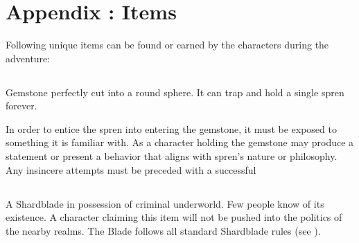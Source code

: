 \chapter{Appendix \thechapter{}: Items}
\label{chap:items}

Following unique items can be found or earned by the characters during the adventure:

\section{\lootPerfectGemstoneName}

Gemstone perfectly cut into a round sphere. It can trap and hold a single spren forever.

In order to entice the spren into entering the gemstone, it must be exposed to something it is familiar with. As \iconAction{} a character holding the gemstone may produce a statement or present a behavior that aligns with spren's nature or philosophy. Any insincere attempts must be preceded with a successful 




\section{\lootRogueShardbladeName}

A Shardblade in possession of criminal underworld. Few people know of its existence. A character claiming this item will not be pushed into the politics of the nearby realms. The Blade follows all standard Shardblade rules (see \handbook{}).\\

\noindent



